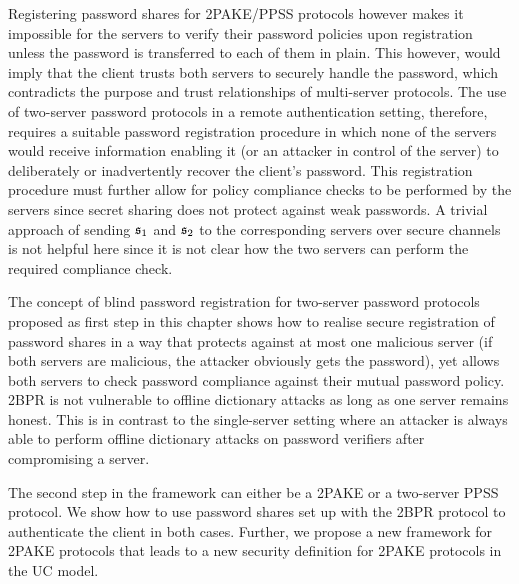 Registering password shares for \ac{2PAKE}/\ac{PPSS} protocols however makes it impossible for the servers to verify their password policies upon registration unless the password is transferred to each of them in plain. 
This however, would imply that the client trusts both servers to securely handle the password, which contradicts the purpose and trust relationships of multi-server protocols.
The use of two-server password protocols in a remote authentication setting, therefore, requires a suitable password registration procedure in which none of the servers would receive information enabling it (or an attacker in control of the server) to deliberately or inadvertently recover the client's password.
This registration procedure must further allow for policy compliance checks to be performed by the servers since secret sharing does not protect against weak passwords.
A trivial approach of sending $\mathfrak{s}_1$ and $\mathfrak{s}_2$ to the corresponding servers over secure channels is not helpful here since it is not clear how the two servers can perform the required compliance check.

The concept of blind password registration for two-server password protocols proposed as first step in this chapter shows how to realise secure registration of password shares in a way that protects against at most one malicious server (if both servers are malicious, the attacker obviously gets the password), yet allows both servers to check password compliance against their mutual password policy.
\ac{2BPR} is not vulnerable to offline dictionary attacks as long as one server remains honest.
This is in contrast to the single-server setting where an attacker is always able to perform offline dictionary attacks on password verifiers after compromising a server. 

The second step in the framework can either be a \ac{2PAKE} or a two-server \ac{PPSS} protocol.
We show how to use password shares set up with the \ac{2BPR} protocol to authenticate the client in both cases.
Further, we propose a new framework for \ac{2PAKE} protocols that leads to a new security definition for \ac{2PAKE} protocols in the \ac{UC} model.


